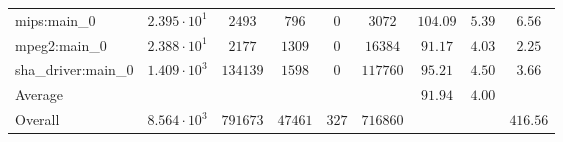 \begin{tabular}{|l|c|c|c|c|c|c|c|c|}
mips:main\_0            & $ 2.395 \cdot 10^{1} $ & $ 2493   $ & $ 796   $ & $ 0   $ & $ 3072   $ & $ 104.09      $ & $ 5.39    $ & $ 6.56    $ \\
mpeg2:main\_0           & $ 2.388 \cdot 10^{1} $ & $ 2177   $ & $ 1309  $ & $ 0   $ & $ 16384  $ & $ 91.17       $ & $ 4.03    $ & $ 2.25    $ \\
sha\_driver:main\_0     & $ 1.409 \cdot 10^{3} $ & $ 134139 $ & $ 1598  $ & $ 0   $ & $ 117760 $ & $ 95.21       $ & $ 4.50    $ & $ 3.66    $ \\
\hline
Average                 & $                    $ & $        $ & $       $ & $     $ & $        $ & $ 91.94       $ & $ 4.00    $ & $         $ \\
\hline
Overall                 & $ 8.564 \cdot 10^{3} $ & $ 791673 $ & $ 47461 $ & $ 327 $ & $ 716860 $ & $             $ & $         $ & $ 416.56  $ \\
\hline
\end{tabular}
